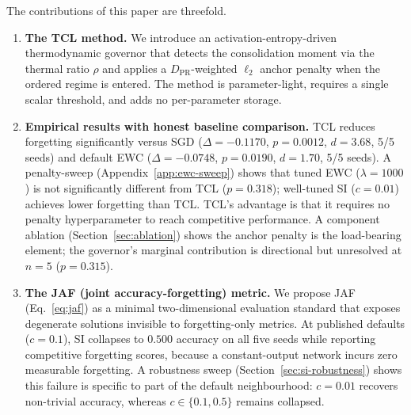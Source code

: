 \documentclass[10pt,a4paper]{article}
\begin{document}
The contributions of this paper are threefold.
\begin{enumerate}
  \item \textbf{The TCL method.}
        We introduce an activation-entropy-driven thermodynamic governor
        that detects the consolidation moment via the thermal ratio $\rho$
        and applies a $D_\text{PR}$-weighted $\ell_2$ anchor penalty when the
        ordered regime is entered.
        The method is parameter-light, requires a single scalar threshold,
        and adds no per-parameter storage.

  \item \textbf{Empirical results with honest baseline comparison.}
        TCL reduces forgetting significantly versus SGD ($\Delta = -0.1170$,
        $p = 0.0012$, $d = 3.68$, 5/5 seeds) and default EWC
        ($\Delta = -0.0748$, $p = 0.0190$, $d = 1.70$, 5/5 seeds).
        A penalty-sweep (Appendix~\ref{app:ewc-sweep}) shows that tuned EWC
        ($\lambda = 1000$) is not significantly different from TCL ($p = 0.318$);
        well-tuned SI ($c = 0.01$) achieves lower forgetting than TCL.
        TCL's advantage is that it requires no penalty hyperparameter to reach
        competitive performance.
        A component ablation (Section~\ref{sec:ablation}) shows the anchor penalty
        is the load-bearing element; the governor's marginal contribution is
        directional but unresolved at $n = 5$ ($p = 0.315$).

  \item \textbf{The JAF (joint accuracy-forgetting) metric.}
        We propose JAF (Eq.~\ref{eq:jaf}) as a minimal two-dimensional evaluation
        standard that exposes degenerate solutions invisible to forgetting-only
        metrics.
        At published defaults ($c = 0.1$), SI collapses to $0.500$ accuracy on all
        five seeds while reporting competitive forgetting scores, because a constant-output
        network incurs zero measurable forgetting.
        A robustness sweep (Section~\ref{sec:si-robustness}) shows this failure is
        specific to part of the default neighbourhood: $c = 0.01$ recovers non-trivial
        accuracy, whereas $c \in \{0.1, 0.5\}$ remains collapsed.
\end{enumerate}
\end{document}
